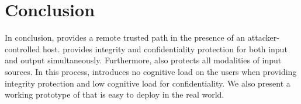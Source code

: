 \section{Conclusion}
\label{sec:conclusion}

In conclusion, \name provides a remote trusted path in the presence of an attacker-controlled host. \name provides integrity and confidentiality protection for both input and output simultaneously. Furthermore, \name also protects all modalities of input sources. In this process, \name introduces no cognitive load on the users when providing integrity protection and low cognitive load for confidentiality. We also present a working prototype of \name that is easy to deploy in the real world.